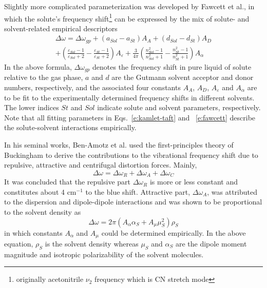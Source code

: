 \documentclass[a4paper,titlepage,twoside,fleqn,12pt]{book}
\begin{document}
\begin{refsection}
Slightly more complicated parameterization was developed 
by Fawcett et al.\citep{Reimers.Hall.JACS.1999,Fawcett.Liu.Kessler.JPC.1993,Fawcett.Kloss.JCP.1996},
in which the solute's frequency shift\footnote{originally acetonitrile $\nu_2$ frequency
which is CN stretch mode} can be expressed by the mix of solute- and
solvent-related empirical descriptors
%
\begin{multline} \label{e:fawcett}
\Delta \omega = \Delta \omega_{gp} + 
\left( a_{Sol} - a_{St} \right) A_A +
\left( d_{Sol} - d_{St} \right) A_D \\ + 
\left( \frac{\varepsilon_{Sol}-1}{\varepsilon_{Sol}+2} - \frac{\varepsilon_{St}-1}{\varepsilon_{St}+2} \right) A_\varepsilon +
\frac{3}{4\pi}
\left( \frac{n^2_{Sol}-1}{n^2_{Sol}+1} - \frac{n^2_{St}-1}{n^2_{St}+1} \right) A_\alpha
\end{multline}
%
In the above formula, $\Delta \omega_{gp}$ denotes the frequency shift in pure liquid of solute
relative to the gas phase,
$a$ and $d$ are the Gutmann solvent acceptor and donor numbers\citep{Gutmann.Resch.Linert.CoordChemRev.1982}, 
respectively,
and the associated four constants $A_A$, $A_D$, $A_\varepsilon$ and $A_\alpha$ 
are to be fit to the experimentally determined frequency shifts in different solvents.
The lower indices $St$ and $Sol$ indicate solute and solvent parameters, respectively. 
Note that all fitting parameters in Eqs.~\eqref{e:kamlet-taft} and ~\eqref{e:fawcett} 
describe the solute-solvent interactions empirically.

In his seminal works, Ben-Amotz et al.\citep{Ben-Amotz.Lee.Cho.List.JCP.1992} 
used the first-principles theory of Buckingham
to derive the contributions to the vibrational frequency shift due to
repulsive, attractive and centrifugal distortion forces. Mainly,
%
\begin{equation} \label{e:ben-amotz}
 \Delta \omega = \Delta \omega_R + \Delta \omega_A + \Delta \omega_C
\end{equation}
%
It was concluded that the repulsive part $\Delta \omega_R$ is more or less constant
and constitutes about 4 cm$^{-1}$ to the blue shift. Attractive part, $\Delta \omega_A$,
was attributed to the dispersion and dipole-dipole interactions
and was shown to be proportional to the solvent density as
%
\begin{equation} \label{e:ben-amotz-ro}
 \Delta \omega = 2\pi\left( A_\alpha \alpha_S + A_\mu \mu_S^2 \right) \rho_S
\end{equation}
%
in which constants $A_\alpha$ and $A_\mu$ could be determined empirically. 
In the above equation, $\rho_S$ is the solvent density whereas $\mu_S$ and $\alpha_S$ are the
dipole moment magnitude and isotropic polarizability of the solvent molecules.


\end{refsection}
\end{document}
